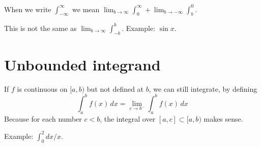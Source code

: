 \documentclass[12pt]{article}
\begin{document}
When we write $\int_{-\infty}^\infty$ we mean $\lim_{b \to \infty} \int_0^\infty + \lim_{b \to -\infty} \int_{b}^0$.

This is not the same as $\lim_{b \to \infty} \int_{-b}^b$.  Example: $\sin x$.

\section{Unbounded integrand}

If $f$ is continuous on $[a,b)$ but not defined at $b$, we can still
integrate, by defining
$$
\int_{a}^b f(x) \, dx = \lim_{c \to b^{-}} \int_a^b f(x) \, dx
$$
Because for each number $c < b$, the integral over $[a,c] \subset
[a,b)$ makes sense.

Example: $\int_0^2 dx / x$.
\end{document}
